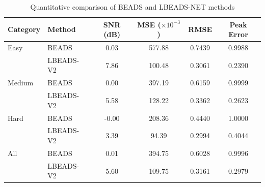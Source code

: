 \begin{table}[htbp]
\centering
\caption{Quantitative comparison of BEADS and LBEADS-NET methods}
\label{tab:results}
\begin{tabular}{llcccc}
\toprule
Category & Method & SNR (dB) & MSE ($\times 10^{-3}$) & RMSE & Peak Error \\
\midrule
Easy & BEADS & 0.03 & 577.88 & 0.7439 & 0.9988 \\
 & LBEADS-V2 & 7.86 & 100.48 & 0.3061 & 0.2390 \\
\midrule
Medium & BEADS & 0.00 & 397.19 & 0.6159 & 0.9999 \\
 & LBEADS-V2 & 5.58 & 128.22 & 0.3362 & 0.2623 \\
\midrule
Hard & BEADS & -0.00 & 208.36 & 0.4440 & 1.0000 \\
 & LBEADS-V2 & 3.39 & 94.39 & 0.2994 & 0.4044 \\
\midrule
All & BEADS & 0.01 & 394.75 & 0.6028 & 0.9996 \\
 & LBEADS-V2 & 5.60 & 109.75 & 0.3161 & 0.2979 \\
\bottomrule
\end{tabular}
\end{table}